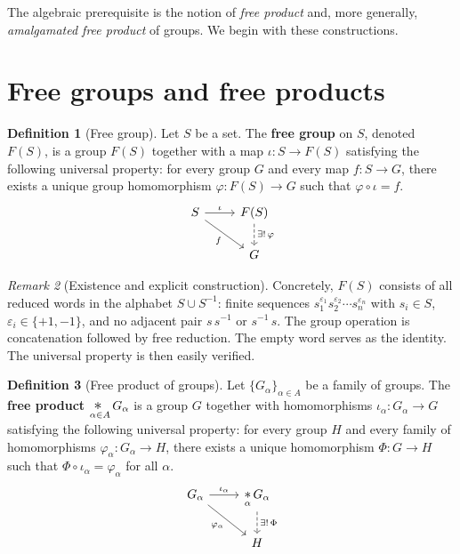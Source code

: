\documentclass[12pt,a4paper,openany]{book}
\theoremstyle{definition}
\newtheorem{definition}{Definition}[chapter]
\theoremstyle{plain}
\theoremstyle{remark}
\newtheorem{remark}[definition]{Remark}
\begin{document}
The algebraic prerequisite is the notion of \emph{free product} and, more
generally, \emph{amalgamated free product} of groups.  We begin with these
constructions.

\section{Free groups and free products}\label{sec:free-products}

\begin{definition}[Free group]\label{def:free-group}
  Let $S$ be a set.  The \textbf{free group} on $S$, denoted $F(S)$, is a group
  $F(S)$ together with a map $\iota\colon S \to F(S)$ satisfying the following
  universal property: for every group $G$ and every map $f\colon S \to G$,
  there exists a unique group homomorphism $\varphi\colon F(S) \to G$ such that
  $\varphi \circ \iota = f$.
  \[
    \begin{tikzcd}
      S \ar[r,"\iota"] \ar[dr,"f"'] & F(S) \ar[d,dashed,"\exists!\,\varphi"] \\
      & G
    \end{tikzcd}
  \]
\end{definition}

\begin{remark}[Existence and explicit construction]\label{rem:free-group-explicit}
  Concretely, $F(S)$ consists of all reduced words in the alphabet
  $S \cup S^{-1}$: finite sequences $s_1^{\varepsilon_1} s_2^{\varepsilon_2}
  \cdots s_n^{\varepsilon_n}$ with $s_i \in S$, $\varepsilon_i \in \{+1,-1\}$,
  and no adjacent pair $s\, s^{-1}$ or $s^{-1}\, s$.  The group operation is
  concatenation followed by free reduction.  The empty word serves as the
  identity.  The universal property is then easily verified.
\end{remark}

\begin{definition}[Free product of groups]\label{def:free-product}
  Let $\{G_\alpha\}_{\alpha \in A}$ be a family of groups.  The
  \textbf{free product} $\displaystyle\mathop{\scalebox{1.3}{$\ast$}}_{\alpha
  \in A} G_\alpha$ is a group $G$ together with homomorphisms
  $\iota_\alpha \colon G_\alpha \to G$ satisfying the following universal
  property: for every group $H$ and every family of homomorphisms
  $\varphi_\alpha \colon G_\alpha \to H$, there exists a unique homomorphism
  $\Phi\colon G \to H$ such that $\Phi \circ \iota_\alpha = \varphi_\alpha$
  for all $\alpha$.
  \[
    \begin{tikzcd}
      G_\alpha \ar[r,"\iota_\alpha"] \ar[dr,"\varphi_\alpha"'] &
      \displaystyle\mathop{\scalebox{1.1}{$\ast$}}_\alpha G_\alpha
        \ar[d,dashed,"\exists!\,\Phi"] \\
      & H
    \end{tikzcd}
  \]
\end{definition}
\end{document}
